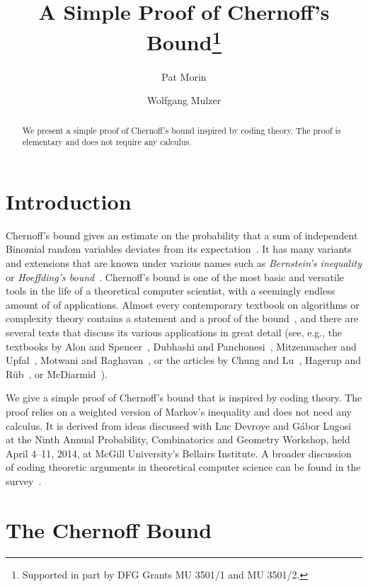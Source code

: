 \documentclass[a4paper,english,numberwithinsect]{oasics-v2016}
\title{A Simple Proof of Chernoff's Bound\footnote{Supported in part 
by DFG Grants MU 3501/1 and MU 3501/2.}}
\author[1]{Pat Morin}
\affil[1]{School of Computer Science, Carleton University, Canada\\
  \texttt{morin@scs.carleton.ca}}
\author[2]{Wolfgang Mulzer}
\affil[2]{Institut f\"ur Informatik, Freie Universit\"at Berlin, Germany\\
  \texttt{mulzer@inf.fu-berlin.de}}
\begin{document}
\maketitle

\begin{abstract}
We present a simple proof of Chernoff's bound inspired by coding theory.
The proof is elementary and does not require any
calculus.
 \end{abstract}

\section{Introduction}
Chernoff's bound gives an estimate on the probability
that a sum of independent Binomial random variables
deviates from its expectation~\cite{Hoeffding63}.
It has many variants and extensions that are known under various 
names such as
\emph{Bernstein's inequality} or \emph{Hoeffding's 
bound}~\cite{Bernstein64,Hoeffding63}.
Chernoff's bound is one of the most basic and versatile
tools in the life of a theoretical computer 
scientist,
with a seemingly endless amount of of applications.
Almost every contemporary textbook on algorithms or 
complexity theory contains a statement and a proof of the 
bound~\cite{AroraBa09,Goldreich08,KleinbergTa06,CormenLeRiSt09}, 
and there are several texts that discuss its various applications 
in great detail (see, e.g., the textbooks by 
Alon and Spencer~\cite{AlonSp16}, 
Dubhashi and Panchonesi~\cite{DubhashiPa09},
Mitzenmacher and Upfal~\cite{MitzenmacherUp17},
Motwani and Raghavan~\cite{MotwaniRa95}, 
or the articles by 
Chung and Lu~\cite{ChungLu06},
Hagerup and R\"ub~\cite{HagerupRu90}, or
McDiarmid~\cite{McDiarmid98}). 

We give a simple proof of Chernoff's bound that is inspired
by coding theory. The proof
relies on a weighted version of Markov's inequality and does
not need any calculus.
It is derived from ideas discussed with Luc Devroye and
G\'abor Lugosi at the
Ninth Annual Probability, Combinatorics
and Geometry Workshop, held April 4--11, 2014, at McGill University's
Bellairs Institute.
A broader discussion of coding theoretic arguments in theoretical
computer science can be found in the survey~\cite{MorinMuRe17}.

\section{The Chernoff Bound}
\end{document}
